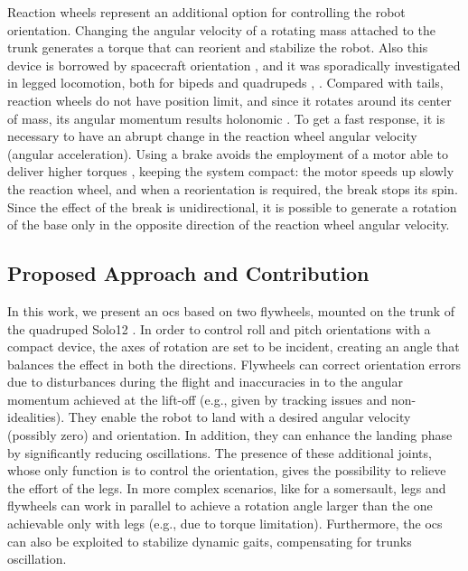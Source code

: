 \documentclass[journal,letterpaper]{IEEEtran}
\begin{document}
Reaction wheels represent an additional option for controlling the robot orientation.
Changing the angular velocity of a rotating mass attached to the trunk generates a torque that can reorient and stabilize the robot. Also this device is borrowed by spacecraft orientation \cite{oland2009reaction}, and it was sporadically investigated in legged locomotion, both for bipeds \cite{Brown2016}  \cite{xiong2020sequential} and quadrupeds \cite{kolvenbach2019towards}, \cite{vasilopoulos2016quadruped}.
Compared with tails, reaction wheels do not have position limit, and since it rotates around its center of mass, its angular momentum results holonomic \cite{machairas2015quadruped}.
To get a fast response, it is necessary to have an abrupt change in the reaction wheel angular velocity (angular acceleration).
Using a brake avoids the employment of a motor able to deliver higher torques \cite{gajamohan2012cubli}, keeping the system compact: the motor speeds up slowly the reaction wheel, and when a reorientation is required, the break stops its spin.
Since the effect of the break is unidirectional, it is possible to generate a rotation of the base only in the opposite direction of the reaction wheel angular velocity.

\subsection{Proposed Approach and Contribution}
In this work, we present an \acrfull{ocs} based on two flywheels, mounted on the trunk of the quadruped Solo12 \cite{grimminger2020open}. In order to control roll and pitch orientations with a compact device, the axes of rotation are set to be incident, creating an angle that balances the effect in both the directions. 
Flywheels can correct orientation errors due to disturbances during the flight and inaccuracies in to the angular momentum achieved at the lift-off (e.g., given by tracking issues and non-idealities). 
They enable the robot to land with a desired angular velocity (possibly zero) and orientation.
In addition, they can enhance the landing phase by significantly reducing oscillations.  
The presence of these additional joints, whose only function is to control the orientation, gives the possibility to relieve the effort of the legs.
In more complex scenarios, like for a somersault, legs and flywheels can work in parallel to achieve a rotation angle larger than the one achievable only with legs (e.g., due to torque limitation). Furthermore, the \acrshort{ocs} can also be exploited to stabilize dynamic gaits, compensating for trunks oscillation.
\end{document}
